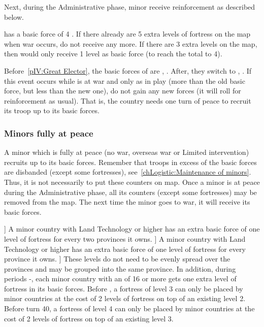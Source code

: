 \aparag Next, during the Administrative phase, minor receive reinforcement as
described below.

\begin{exemple}
  \paysVenise has a basic force of 4 \fortress. If there already are 5 extra
  levels of fortress on the map when war occurs, \paysVenise do not receive
  any more. If there are 3 extra levels on the map, then \paysVenise would
  only receive 1 level as basic force (to reach the total to 4).

  Before~\ref{pIV:Great Elector}, the basic forces of \paysBrandebourg are
  \ARMY\facemoins, \LD. After, they switch to \ARMY\faceplus, \LD. If this
  event occurs while \paysBrandebourg is at war and only as \ARMY\faceplus in
  play (more than the old basic force, but less than the new one),
  \paysBrandebourg do not gain any new forces (it will roll for reinforcement
  as usual). That is, the country needs one turn of peace to recruit its troop
  up to its basic forces.
\end{exemple}

\subsubsection{Minors fully at peace}
 A minor which is fully at peace (no war, overseas
war or Limited intervention) recruits up to its basic forces.
\bparag Remember that troops in excess of the basic forces are disbanded
(except some fortresses), see~\ref{chLogistic:Maintenance of minors}.
\bparag Thus, it is not necessarily to put these counters on map. Once a minor
is at peace during the Administrative phase, all its counters (except some
fortresses) may be removed from the map. The next time the minor goes to war,
it will receive its basic forces.

\aparag[Fortresses]
\bparag [[TBD]] A minor country with Land Technology \TBAR or higher has an
extra basic force of one level of fortress for every two provinces it owns.
\bparag [[TBD]] A minor country with Land Technology \TMAN or higher has an
extra basic force of one level of fortress for every province it owns.
\bparag [[TBD]] These levels do not need to be evenly spread over the
provinces and may be grouped into the same province.
\bparag In addition, during periods -, each minor
country with an  of 16 or more gets one extra level of fortress
in its basic forces.
\bparag Before \TARQ, a fortress of level 3 can only be placed by minor
countries at the cost of 2 levels of fortress on top of an existing level 2.
\bparag Before turn 40, a fortress of level 4 can only be placed by minor
countries at the cost of 2 levels of fortress on top of an existing level 3.

